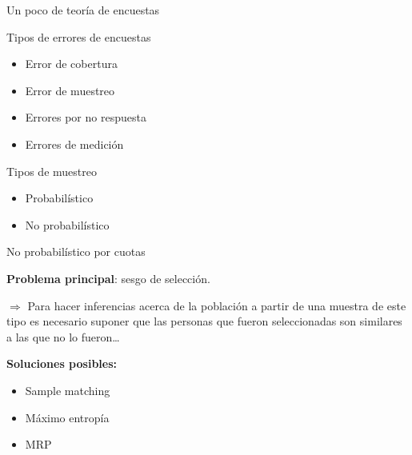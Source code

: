 \documentclass[ignorenonframetext,]{beamer}
\begin{document}
\begin{frame}{Un poco de teoría de encuestas}

\begin{block}{Tipos de errores de encuestas}

\begin{itemize}
\itemsep1pt\parskip0pt
\item
  Error de cobertura
\item
  Error de muestreo
\item
  Errores por no respuesta
\item
  Errores de medición
\end{itemize}

\end{block}

\begin{block}{Tipos de muestreo}

\begin{itemize}
\itemsep1pt\parskip0pt
\item
  Probabilístico
\item
  No probabilístico
\end{itemize}

\end{block}

\end{frame}

\begin{frame}{No probabilístico por cuotas}

\textbf{Problema principal}: sesgo de selección.

$\Rightarrow$ Para hacer inferencias acerca de la población a partir de
una muestra de este tipo es necesario suponer que las personas que
fueron seleccionadas son similares a las que no lo fueron\ldots{}

\textbf{Soluciones posibles:}

\begin{itemize}
\itemsep1pt\parskip0pt
\item
  Sample matching
\item
  Máximo entropía
\item
  MRP
\end{itemize}

\end{frame}
\end{document}

